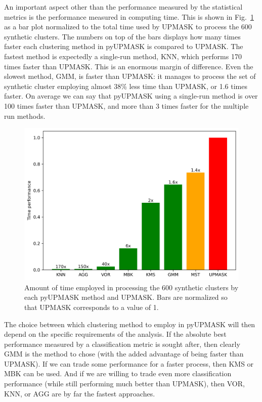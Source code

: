 \documentclass{aa}
\begin{document}
 An important aspect other than the performance measured by the
 statistical metrics is the performance measured in computing time. This is
 shown in Fig.~\ref{fig:timeanalys} as a bar plot normalized to the total time
 used by UPMASK to process the 600 synthetic clusters. The numbers on top of
 the bars displays how many times faster each clustering method in pyUPMASK is
 compared to UPMASK. The fastest method is expectedly a single-run method, KNN,
 which performs 170 times faster than UPMASK. This is an enormous margin of
 difference. Even the slowest method, GMM, is faster than UPMASK: it manages to
 process the set of synthetic cluster employing almost 38\% less time than
 UPMASK, or 1.6 times faster. On average we can say that pyUPMASK using a
 single-run method is over 100 times faster than UPMASK, and more than 3 times
 faster for the multiple run methods.\\

 \begin{figure}
  \centering
  \includegraphics[width=\hsize]{figs/time_analysis.png}
  \caption{Amount of time employed in processing the 600 synthetic clusters by
  each pyUPMASK method and UPMASK. Bars are normalized so that UPMASK
  corresponds to a value of 1.}
  \label{fig:timeanalys}
 \end{figure}

 The choice between which clustering method to employ in pyUPMASK will then
 depend on the specific requirements of the analysis. If the absolute best
 performance measured by a classification metric is sought after, then clearly
 GMM is the method to chose (with the added advantage of being faster than
 UPMASK). If we can trade some performance for a faster
 process, then KMS or MBK can be used. And if we are willing to trade even more
 classification performance (while still performing much better than UPMASK),
 then VOR, KNN, or AGG are by far the fastest approaches.
\end{document}

